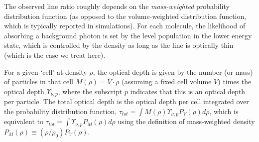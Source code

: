 The observed \formaldehyde line ratio roughly depends on the
\emph{mass-weighted} probability distribution function (as opposed to the
volume-weighted distribution function, which is typically reported in
simulations).  For each \formaldehyde molecule, the likelihood of absorbing a
background photon is set by the level population in the lower energy state,
which is controlled by the \hh density as long as the line is optically thin
(which is the case we treat here).

For a given `cell' at density $\rho$, the optical depth is given by the number
(or mass) of particles in that cell $M(\rho) = V \cdot \rho$  (assuming a fixed
cell volume $V$) times the optical depth $\Upsilon_{\nu,p}$, where the subscript $p$ indicates
that this is an optical depth per particle.
The total optical depth is the optical depth per cell integrated over the
probability distribution function, $\tau_{tot} = \int M(\rho) \Upsilon_{\nu,p}
P_V(\rho) d\rho$, which is equivalent to $\tau_{tot} = \int \Upsilon_{\nu,p} P_M(\rho) d\rho$
using the definition of mass-weighted density $P_M(\rho) \equiv (\rho/\rho_0) P_V(\rho)$.



